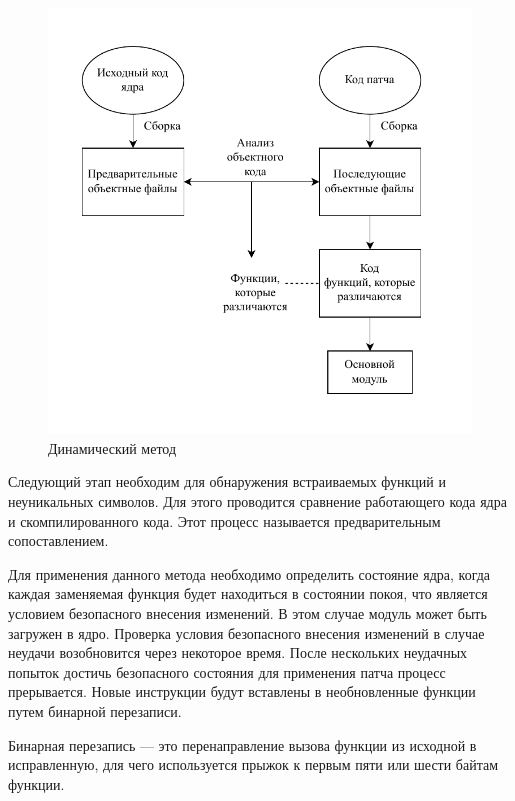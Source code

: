 \begin{figure}[H]
	\begin{center}
		\includegraphics[scale=0.8]{img/dynamic.pdf}
	\end{center}
	\captionsetup{justification=centering}
	\caption{Динамический метод}
	\label{img:dynamic}
\end{figure}

Следующий этап необходим для обнаружения встраиваемых функций и неуникальных символов. Для этого проводится сравнение работающего кода ядра и скомпилированного кода. Этот процесс называется предварительным сопоставлением.

Для применения данного метода необходимо определить состояние ядра, когда каждая заменяемая функция будет находиться в состоянии покоя, что является условием безопасного внесения изменений. В этом случае модуль может быть загружен в ядро. Проверка условия безопасного внесения изменений в случае неудачи возобновится через некоторое время. После нескольких неудачных попыток достичь безопасного состояния для применения патча процесс прерывается. Новые инструкции будут вставлены в необновленные функции путем бинарной перезаписи.

Бинарная перезапись \cite{binary} --- это перенаправление вызова функции из исходной в исправленную, для чего используется прыжок к первым пяти или шести байтам функции.

